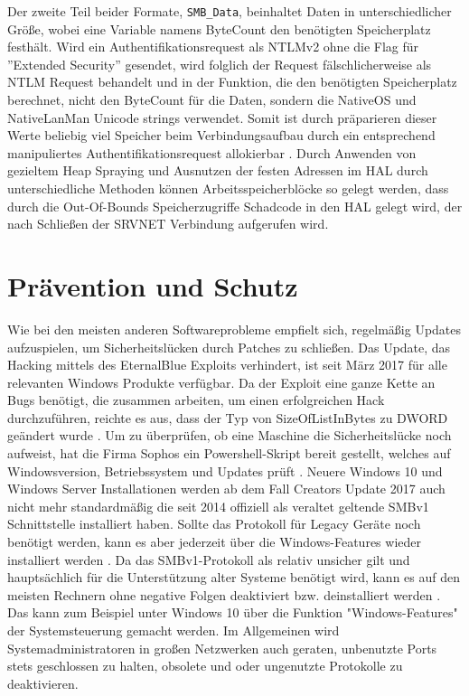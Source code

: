 \documentclass[DIV=12,headings=normal,pdftex,headinclude=false,footinclude=false,final]{scrreprt}
\begin{document}
Der zweite Teil beider Formate, \verb|SMB_Data|, beinhaltet Daten in unterschiedlicher Größe, wobei eine Variable namens ByteCount den benötigten Speicherplatz festhält\cite{CP}.
Wird ein Authentifikationsrequest als NTLMv2 ohne die Flag für ''Extended Security'' gesendet, wird folglich der Request fälschlicherweise als NTLM Request behandelt und in der Funktion, die den benötigten Speicherplatz berechnet, nicht den ByteCount für die Daten, sondern die NativeOS und NativeLanMan Unicode strings verwendet. Somit ist durch präparieren dieser Werte beliebig viel Speicher beim Verbindungsaufbau durch ein entsprechend manipuliertes Authentifikationsrequest allokierbar \cite{CP}. Durch Anwenden von gezieltem Heap Spraying\cite{ARC} und Ausnutzen der festen Adressen im HAL durch unterschiedliche Methoden können Arbeitsspeicherblöcke so gelegt werden, dass durch die Out-Of-Bounds Speicherzugriffe Schadcode in den HAL gelegt wird, der nach Schließen der SRVNET Verbindung aufgerufen wird\cite{CP}.


\chapter{Prävention und Schutz}
Wie bei den meisten anderen Softwareprobleme empfielt sich, regelmäßig Updates aufzuspielen, um Sicherheitslücken durch Patches zu schließen. Das Update, das Hacking mittels des EternalBlue Exploits verhindert, ist seit März 2017 für alle relevanten Windows Produkte verfügbar.
Da der Exploit eine ganze Kette an Bugs benötigt, die zusammen arbeiten, um einen erfolgreichen Hack durchzuführen, reichte es aus, dass der Typ von SizeOfListInBytes zu DWORD geändert wurde \cite{Scad:EB}.
Um zu überprüfen, ob eine Maschine die Sicherheitslücke noch aufweist, hat die Firma Sophos ein Powershell-Skript bereit gestellt, welches auf Windowsversion, Betriebssystem und Updates prüft \cite{SAV}.
Neuere Windows 10 und Windows Server Installationen werden ab dem Fall Creators Update 2017 auch nicht mehr standardmäßig die seit 2014 offiziell als veraltet geltende SMBv1 Schnittstelle installiert haben. Sollte das Protokoll für Legacy Geräte noch benötigt werden, kann es aber jederzeit über die Windows-Features wieder installiert werden \cite{MS:Fix}.
Da das SMBv1-Protokoll als relativ unsicher gilt und hauptsächlich für die Unterstützung alter Systeme benötigt wird, kann es auf den meisten Rechnern ohne negative Folgen deaktiviert bzw. deinstalliert werden \cite{WP}. Das kann zum Beispiel unter Windows 10 über die Funktion "Windows-Features" der Systemsteuerung gemacht werden.
Im Allgemeinen wird Systemadministratoren in großen Netzwerken auch geraten, unbenutzte Ports stets geschlossen zu halten, obsolete und oder ungenutzte Protokolle zu deaktivieren.\cite{TM:EB}
\end{document}
